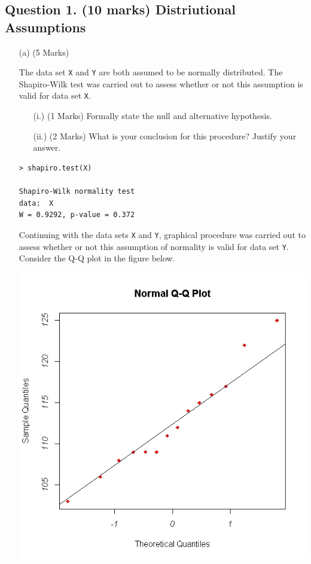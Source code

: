 \documentclass[a4paper,12pt]{article}
\begin{document}
\subsection*{Question 1. (10 marks) Distriutional Assumptions}
\begin{itemize}
\item[(a)] (5 Marks) 

The data set \texttt{X} and \texttt{Y} are both assumed to be normally distributed. The Shapiro-Wilk test was carried out to assess whether or not this assumption is valid for data set \texttt{X}.
\begin{itemize}
	\item[(i.)] (1 Marks) Formally state the null and alternative hypothesis.
	\item[(ii.)] (2 Marks) What is your conclusion for this procedure? Justify your answer.
\end{itemize}
\begin{framed}
\begin{verbatim}
> shapiro.test(X)
	
Shapiro-Wilk normality test
data:  X
W = 0.9292, p-value = 0.372
\end{verbatim}
\end{framed}

 Continuing with the data sets \texttt{X} and \texttt{Y}, graphical procedure was carried out to assess whether or not this assumption of normality is valid for data set \texttt{Y}. Consider the Q-Q plot in the figure below.

\begin{center}
	\includegraphics[scale=0.45]{Q5examQQplot}
\end{center}


\end{itemize}
\end{document}
